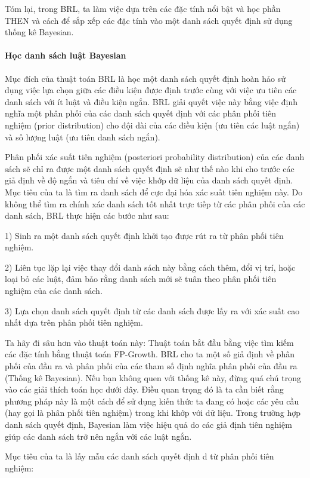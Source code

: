 Tóm lại, trong BRL, ta làm việc dựa trên các đặc tính nổi bật và học phần THEN và cách để sắp xếp các đặc tính vào một danh sách quyết định sử dụng thống kê Bayesian.

\paragraph{Học danh sách luật Bayesian}
Mục đích của thuật toán BRL là học một danh sách quyết định hoàn hảo sử dụng việc lựa chọn giữa các điều kiện được định trước cùng với việc ưu tiên các danh sách với ít luật và điều kiện ngắn. BRL giải quyết việc này bằng việc định nghĩa một phân phối của các danh sách quyết định với các phân phối tiên nghiệm (prior distribution) cho đội dài của các điều kiện (ưu tiên các luật ngắn) và số lượng luật (ưu tiên danh sách ngắn).

Phân phối xác suất tiên nghiệm (posteriori probability distribution) của các danh sách sẽ chỉ ra được một danh sách quyết định sẽ như thế nào khi cho trước các giả định về độ ngắn và tiêu chí về việc khớp dữ liệu của danh sách quyết định. Mục tiêu của ta là tìm ra danh sách để cực đại hóa xác suất tiên nghiệm này. Do không thể tìm ra chính xác danh sách tốt nhất trực tiếp từ các phân phối của các danh sách, BRL thực hiện các bước như sau:

1) Sinh ra một danh sách quyết định khởi tạo được rút ra từ phân phối tiên nghiệm.

2) Liên tục lặp lại việc thay đổi danh sách này bằng cách thêm, đổi vị trí, hoặc loại bỏ các luật, đảm bảo rằng danh sách mới sẽ tuân theo phân phối tiên nghiệm của các danh sách.

3) Lựa chọn danh sách quyết định từ các danh sách được lấy ra với xác suất cao nhất dựa trên phân phối tiên nghiệm.

Ta hãy đi sâu hơn vào thuật toán này: Thuật toán bắt đầu bằng việc tìm kiếm các đặc tính bằng thuật toán FP-Growth. BRL cho ta một số giả định về phân phối của đầu ra và phân phối của các tham số định nghĩa phân phối của đầu ra (Thống kê Bayesian). Nếu bạn không quen với thống kê này, đừng quá chú trọng vào các giải thích toán học dưới đây. Điều quan trọng đó là ta cần biết rằng phương pháp này là một cách để sử dụng kiến thức ta đang có hoặc các yêu cầu (hay gọi là phân phối tiên nghiệm) trong khi khớp với dữ liệu. Trong trường hợp danh sách quyết định, Bayesian làm việc hiệu quả do các giả định tiên nghiệm giúp các danh sách trở nên ngắn với các luật ngắn.

Mục tiêu của ta là lấy mẫu các danh sách quyết định d từ phân phối tiên nghiệm:

